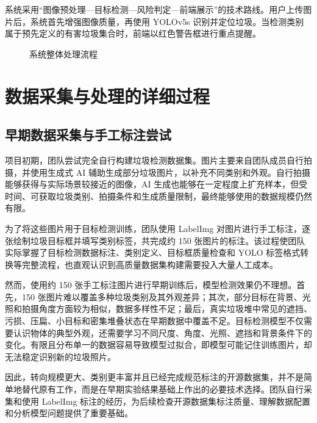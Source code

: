 \documentclass[UTF8,a4paper,12pt]{ctexart}
\begin{document}
系统采用“图像预处理---目标检测---风险判定---前端展示”的技术路线。用户上传图片后，系统首先增强图像质量，再使用 YOLOv5s 识别并定位垃圾。当检测类别属于预先定义的有害垃圾集合时，前端以红色警告框进行重点提醒。

\begin{figure}[H]
  \centering
  \caption{系统整体处理流程}
\end{figure}

\section{数据采集与处理的详细过程}

\subsection{早期数据采集与手工标注尝试}

项目初期，团队尝试完全自行构建垃圾检测数据集。图片主要来自团队成员自行拍摄，并使用生成式 AI 辅助生成部分垃圾图片，以补充不同类别和外观。自行拍摄能够获得与实际场景较接近的图像，AI 生成也能够在一定程度上扩充样本，但受时间、可获取垃圾类别、拍摄条件和生成质量限制，最终能够使用的数据规模仍然有限。

为了将这些图片用于目标检测训练，团队使用 LabelImg 对图片进行手工标注，逐张绘制垃圾目标框并填写类别标签，共完成约 150 张图片的标注。该过程使团队实际掌握了目标检测数据标注、类别定义、目标框质量检查和 YOLO 标签格式转换等完整流程，也直观认识到高质量数据集构建需要投入大量人工成本。

然而，使用约 150 张手工标注图片进行早期训练后，模型检测效果仍不理想。首先，150 张图片难以覆盖多种垃圾类别及其外观差异；其次，部分目标在背景、光照和拍摄角度方面较为相似，数据多样性不足；最后，真实垃圾堆中常见的遮挡、污损、压扁、小目标和密集堆叠状态在早期数据中覆盖不足。目标检测模型不仅需要认识物体的典型外观，还需要学习不同尺度、角度、光照、遮挡和背景条件下的变化。有限且分布单一的数据容易导致模型过拟合，即模型可能记住训练图片，却无法稳定识别新的垃圾照片。

因此，转向规模更大、类别更丰富并且已经完成规范标注的开源数据集，并不是简单地替代原有工作，而是在早期实验结果基础上作出的必要技术选择。团队自行采集和使用 LabelImg 标注的经历，为后续检查开源数据集标注质量、理解数据配置和分析模型问题提供了重要基础。
\end{document}

